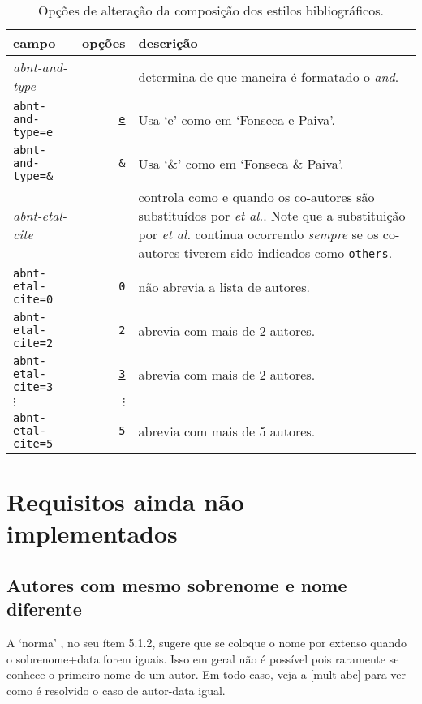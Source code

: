 \documentclass[a4paper]{ltxdoc}
\begin{document}
\begin{table}[htbp]
\caption[Opções de alteração dos estilos bibliográficos: composição]{
Opções de alteração da composição dos estilos bibliográficos.}
\label{tabela-opcoes}

\begin{center}
\begin{tabular}{lrp{7cm}}\hline\hline
campo & opções & descrição \\ \hline
\emph{abnt-and-type} & & determina de que maneira é formatado o \emph{and}.\\
{\tt abnt-and-type=e} & \underline{\tt e}& Usa `e' como em `Fonseca e Paiva'.\\
{\tt abnt-and-type=\&} & {\tt \&} & Usa `\&' como em `Fonseca \& Paiva'.
\\ \hline
\emph{abnt-etal-cite} &  & controla como e quando os co-autores são
substituídos por \emph{et al.}.  Note que a substituição
por \emph{et al.} continua ocorrendo \emph{sempre} se os co-autores tiverem sido indicados
como {\tt others}.\\
{\tt abnt-etal-cite=0}&{\tt 0}& não abrevia a lista de autores.\\
{\tt abnt-etal-cite=2}& {\tt 2} & abrevia com mais de 2 autores.\\
{\tt abnt-etal-cite=3}& \underline{\tt 3} & abrevia com mais de 2 autores.\\
$\vdots$ & $\vdots$ & \\
{\tt abnt-etal-cite=5}& {\tt 5} & abrevia com mais de 5 autores.
\\ \hline\hline
\end{tabular}
\end{center}
\end{table}


\section{Requisitos ainda não implementados}

\subsection{Autores com mesmo sobrenome e nome diferente}

A `norma' \cite{NBR10520:2001}, no seu ítem 5.1.2, sugere que se coloque o nome
por extenso quando o sobrenome+data forem iguais. Isso em geral não é possível
pois raramente se conhece o primeiro nome de um autor. Em todo caso, veja a
\autoref{mult-abc} para ver como é resolvido o caso de autor-data igual.
\end{document}
